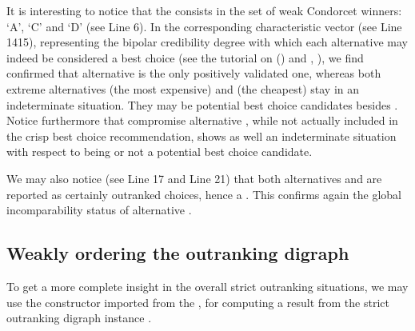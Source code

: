 \documentclass[a4paper,10pt,english]{sphinxhowto}
\begin{document}
It is interesting to notice that the  consists in the set of weak Condorcet winners: ‘A’, ‘C’ and ‘D’ (see Line 6). In the corresponding characteristic vector (see Line 14\sphinxhyphen{}15), representing the bipolar credibility degree with which each alternative may indeed be considered a best choice (see the tutorial on {\hyperref[\detokenize{tutorial:bipolar-valued-kernels-tutorial-label}]{}} () and , ), we find confirmed that alternative  is the only positively validated one, whereas both extreme alternatives \sphinxhyphen{}  (the most expensive) and  (the cheapest) \sphinxhyphen{} stay in an indeterminate situation. They may be potential best choice candidates besides . Notice furthermore that compromise alternative , while not actually included in the crisp best choice recommendation, shows as well an indeterminate situation with respect to being or not a potential best choice candidate.

We may also notice (see Line 17 and Line 21) that both alternatives  and  are reported as certainly outranked choices, hence a  . This confirms again the global incomparability status of alternative .


\subsection{Weakly ordering the outranking digraph}
\label{\detokenize{tutorial:weakly-ordering-the-outranking-digraph}}
To get a more complete insight in the overall strict outranking situations, we may use the  constructor imported from the , for computing a  result from the strict outranking digraph instance .
\end{document}
